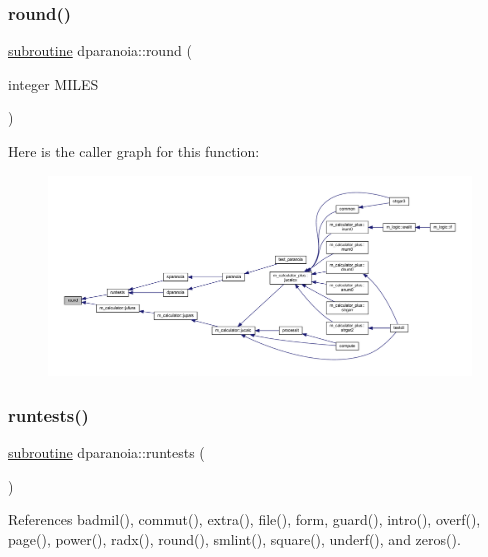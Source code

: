 \subsubsection{\texorpdfstring{round()}{round()}}
{\footnotesize\ttfamily \hyperlink{M__stopwatch_83_8txt_acfbcff50169d691ff02d4a123ed70482}{subroutine} dparanoia\+::round (\begin{DoxyParamCaption}\item[{integer}]{M\+I\+L\+ES }\end{DoxyParamCaption})}

Here is the caller graph for this function\+:
\nopagebreak
\begin{figure}[H]
\begin{center}
\leavevmode
\includegraphics[width=350pt]{dparanoia_8f90_ac9fa3597b76a0e3e3622dee7db0246cd_icgraph}
\end{center}
\end{figure}
\mbox{\label{dparanoia_8f90_a210778c94f0b539462736c5c6867e960}} 
\subsubsection{\texorpdfstring{runtests()}{runtests()}}
{\footnotesize\ttfamily \hyperlink{M__stopwatch_83_8txt_acfbcff50169d691ff02d4a123ed70482}{subroutine} dparanoia\+::runtests (\begin{DoxyParamCaption}{ }\end{DoxyParamCaption})}



References badmil(), commut(), extra(), file(), form, guard(), intro(), overf(), page(), power(), radx(), round(), smlint(), square(), underf(), and zeros().

